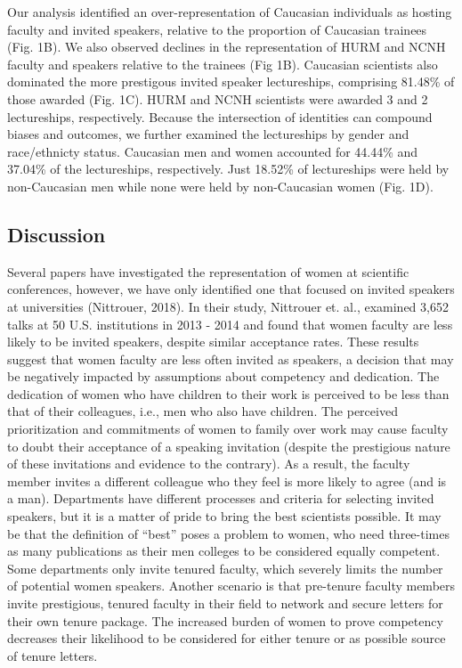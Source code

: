 \documentclass[10pt,]{article}
\begin{document}
Our analysis identified an over-representation of Caucasian individuals
as hosting faculty and invited speakers, relative to the proportion of
Caucasian trainees (Fig. 1B). We also observed declines in the
representation of HURM and NCNH faculty and speakers relative to the
trainees (Fig 1B). Caucasian scientists also dominated the more
prestigous invited speaker lectureships, comprising 81.48\% of those
awarded (Fig. 1C). HURM and NCNH scientists were awarded 3 and 2
lectureships, respectively. Because the intersection of identities can
compound biases and outcomes, we further examined the lectureships by
gender and race/ethnicty status. Caucasian men and women accounted for
44.44\% and 37.04\% of the lectureships, respectively. Just 18.52\% of
lectureships were held by non-Caucasian men while none were held by
non-Caucasian women (Fig. 1D).

\subsection{Discussion}\label{discussion}

Several papers have investigated the representation of women at
scientific conferences, however, we have only identified one that
focused on invited speakers at universities (Nittrouer, 2018). In their
study, Nittrouer et. al., examined 3,652 talks at 50 U.S. institutions
in 2013 - 2014 and found that women faculty are less likely to be
invited speakers, despite similar acceptance rates. These results
suggest that women faculty are less often invited as speakers, a
decision that may be negatively impacted by assumptions about competency
and dedication. The dedication of women who have children to their work
is perceived to be less than that of their colleagues, i.e., men who
also have children. The perceived prioritization and commitments of
women to family over work may cause faculty to doubt their acceptance of
a speaking invitation (despite the prestigious nature of these
invitations and evidence to the contrary). As a result, the faculty
member invites a different colleague who they feel is more likely to
agree (and is a man). Departments have different processes and criteria
for selecting invited speakers, but it is a matter of pride to bring the
best scientists possible. It may be that the definition of ``best''
poses a problem to women, who need three-times as many publications as
their men colleges to be considered equally competent. Some departments
only invite tenured faculty, which severely limits the number of
potential women speakers. Another scenario is that pre-tenure faculty
members invite prestigious, tenured faculty in their field to network
and secure letters for their own tenure package. The increased burden of
women to prove competency decreases their likelihood to be considered
for either tenure or as possible source of tenure letters.
\end{document}
